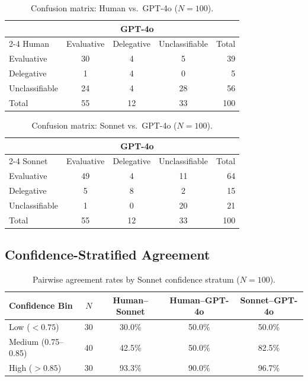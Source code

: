 \begin{table}[H]
\centering
\caption{Confusion matrix: Human vs.\ GPT-4o ($N = 100$).}
\label{tab:cm_human_gpt4o}
\begin{tabular}{lcccr}
\toprule
 & \multicolumn{3}{c}{GPT-4o} & \\
\cmidrule(lr){2-4}
Human & Evaluative & Delegative & Unclassifiable & Total \\
\midrule
Evaluative      & 30 &  4 &  5 &  39 \\
Delegative      &  1 &  4 &  0 &   5 \\
Unclassifiable  & 24 &  4 & 28 &  56 \\
\midrule
Total           & 55 & 12 & 33 & 100 \\
\bottomrule
\end{tabular}
\end{table}

\begin{table}[H]
\centering
\caption{Confusion matrix: Sonnet vs.\ GPT-4o ($N = 100$).}
\label{tab:cm_sonnet_gpt4o}
\begin{tabular}{lcccr}
\toprule
 & \multicolumn{3}{c}{GPT-4o} & \\
\cmidrule(lr){2-4}
Sonnet & Evaluative & Delegative & Unclassifiable & Total \\
\midrule
Evaluative      & 49 &  4 & 11 &  64 \\
Delegative      &  5 &  8 &  2 &  15 \\
Unclassifiable  &  1 &  0 & 20 &  21 \\
\midrule
Total           & 55 & 12 & 33 & 100 \\
\bottomrule
\end{tabular}
\end{table}

\subsection{Confidence-Stratified Agreement}

\begin{table}[H]
\centering
\caption{Pairwise agreement rates by Sonnet confidence stratum ($N = 100$).}
\label{tab:conf_strat}
\begin{tabular}{lcccc}
\toprule
Confidence Bin & $N$ & Human--Sonnet & Human--GPT-4o & Sonnet--GPT-4o \\
\midrule
Low ($< 0.75$)       & 30 & 30.0\% & 50.0\% & 50.0\% \\
Medium (0.75--0.85)  & 40 & 42.5\% & 50.0\% & 82.5\% \\
High ($> 0.85$)      & 30 & 93.3\% & 90.0\% & 96.7\% \\
\bottomrule
\end{tabular}
\end{table}

